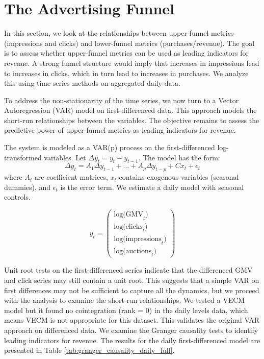 \section*{The Advertising Funnel}

In this section, we look at the relationships between upper-funnel metrics (impressions and clicks) and lower-funnel metrics (purchases/revenue). The goal is to assess whether upper-funnel metrics can be used as leading indicators for revenue. A strong funnel structure would imply that increases in impressions lead to increases in clicks, which in turn lead to increases in purchases. We analyze this using time series methods on aggregated daily data.

To address the non-stationarity of the time series, we now turn to a Vector Autoregression (VAR) model on first-differenced data. This approach models the short-run relationships between the variables. The objective remains to assess the predictive power of upper-funnel metrics as leading indicators for revenue.

The system is modeled as a VAR(p) process on the first-differenced log-transformed variables. Let $\Delta y_t = y_t - y_{t-1}$. The model has the form:
$$ \Delta y_t = A_1 \Delta y_{t-1} + \dots + A_p \Delta y_{t-p} + C x_t + \epsilon_t $$
where $A_i$ are coefficient matrices, $x_t$ contains exogenous variables (seasonal dummies), and $\epsilon_t$ is the error term. We estimate a daily model with seasonal controls.

$$ y_t = \begin{pmatrix} \text{log(GMV}_t\text{)} \\ \text{log(clicks}_t\text{)} \\ \text{log(impressions}_t\text{)} \\ \text{log(auctions}_t\text{)} \end{pmatrix} $$

Unit root tests on the first-differenced series indicate that the differenced GMV and click series may still contain a unit root. This suggests that a simple VAR on first differences may not be sufficient to capture all the dynamics, but we proceed with the analysis to examine the short-run relationships. We tested a VECM model but it found no cointegration (rank = 0) in the daily levels data, which means VECM is not appropriate for this dataset. This validates the original VAR approach on differenced data. We examine the Granger causality tests to identify leading indicators for revenue. The results for the daily first-differenced model are presented in Table \ref{tab:granger_causality_daily_full}.

